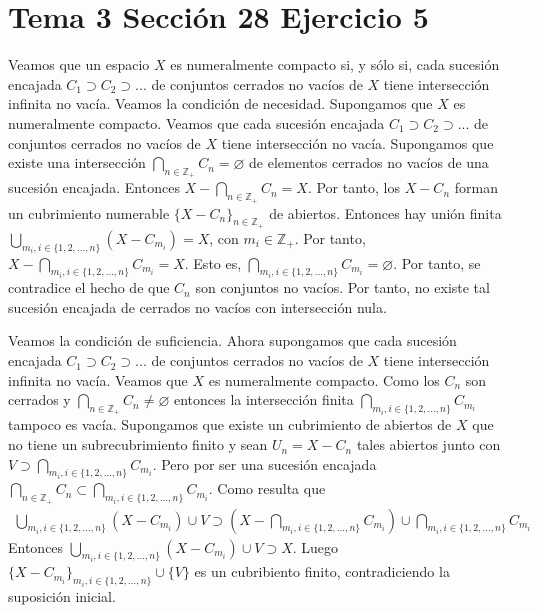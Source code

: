 \documentclass{article}
\begin{document}
\section{Tema 3 Sección 28 Ejercicio 5}
Veamos que un espacio $X$ es numeralmente compacto si, y sólo si, cada sucesión encajada $C_1\supset C_2\supset ...$ de conjuntos cerrados no vacíos de $X$ tiene intersección infinita no vacía.
Veamos la condición de necesidad. Supongamos que $X$ es numeralmente compacto. Veamos que cada sucesión encajada $C_1\supset C_2\supset ...$ de conjuntos cerrados no vacíos de $X$ tiene intersección no vacía. Supongamos que existe una intersección $\bigcap_{n\in \mathbb{Z}_+}C_n=\varnothing$ de elementos cerrados no vacíos de una sucesión encajada. Entonces $X-\bigcap_{n\in\mathbb{Z}_+}C_n =X$. Por tanto, los $X-C_n$ forman un cubrimiento numerable $\{X-C_n\}_{n\in \mathbb{Z}_+}$ de abiertos. Entonces hay unión finita $\bigcup_{m_i, i\in\{1,2,...,n\}}(X-C_{m_i})=X$, con $m_i\in \mathbb{Z}_+$. Por tanto, $X-\bigcap_{m_i, i\in\{1,2,...,n\}}C_{m_i}=X$. Esto es, $\bigcap_{m_i, i\in\{1,2,...,n\}}C_{m_i}=\varnothing$. Por tanto, se contradice el hecho de que $C_n$ son conjuntos no vacíos. Por tanto, no existe tal sucesión encajada de cerrados no vacíos con intersección nula.

Veamos la condición de suficiencia. Ahora supongamos que cada sucesión encajada $C_1\supset C_2\supset ...$ de conjuntos cerrados no vacíos de $X$ tiene intersección infinita no vacía. Veamos que $X$ es numeralmente compacto. Como los $C_n$ son cerrados y $\bigcap_{n\in \mathbb{Z}_+}C_n\neq \varnothing$ entonces la intersección finita $\bigcap_{m_i,i\in\{1,2,..., n\}}C_{m_i}$ tampoco es vacía. Supongamos que existe un cubrimiento de abiertos de $X$ que no tiene un subrecubrimiento finito y sean  $U_n= X-C_n$ tales abiertos junto con $V\supset\bigcap_{m_i,i\in\{1,2,..., n\}}C_{m_i}$. Pero por ser una sucesión encajada $\bigcap_{n\in \mathbb{Z}_+}C_n\subset\bigcap_{m_i,i\in\{1,2,..., n\}}C_{m_i}$. Como resulta que
\begin{eqnarray}\bigcup_{m_i,i\in\{1,2,..., n\}}\left(X-C_{m_i}\right)\cup V\supset \left(X-\bigcap_{m_i,i\in\{1,2,..., n\}}C_{m_i}\right)\cup \bigcap_{m_i,i\in\{1,2,..., n\}}C_{m_i}\nonumber
\end{eqnarray}
Entonces $\bigcup_{m_i,i\in\{1,2,..., n\}}\left(X-C_{m_i}\right)\cup V\supset X$. Luego $\{X-C_{m_i}\}_{m_i,i\in\{1,2,..., n\}}\cup\{V\}$ es un cubribiento finito, contradiciendo la suposición inicial.
\end{document}
